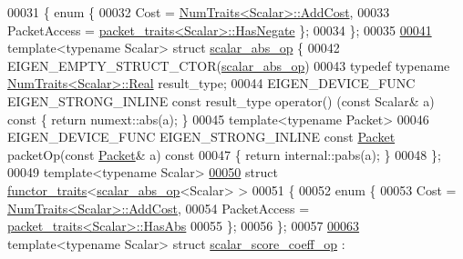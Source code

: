 \begin{DoxyCode}
00031 \{ \textcolor{keyword}{enum} \{
00032     Cost = \hyperlink{group___core___module_struct_eigen_1_1_num_traits}{NumTraits<Scalar>::AddCost},
00033     PacketAccess = \hyperlink{struct_eigen_1_1internal_1_1packet__traits}{packet\_traits<Scalar>::HasNegate} \};
00034 \};
00035 
\hyperlink{struct_eigen_1_1internal_1_1scalar__abs__op}{00041} \textcolor{keyword}{template}<\textcolor{keyword}{typename} Scalar> \textcolor{keyword}{struct }\hyperlink{struct_eigen_1_1internal_1_1scalar__abs__op}{scalar\_abs\_op} \{
00042   EIGEN\_EMPTY\_STRUCT\_CTOR(\hyperlink{struct_eigen_1_1internal_1_1scalar__abs__op}{scalar\_abs\_op})
00043   \textcolor{keyword}{typedef} \textcolor{keyword}{typename} \hyperlink{group___core___module_struct_eigen_1_1_num_traits}{NumTraits<Scalar>::Real} result\_type;
00044   EIGEN\_DEVICE\_FUNC EIGEN\_STRONG\_INLINE \textcolor{keyword}{const} result\_type operator() (\textcolor{keyword}{const} Scalar& a)\textcolor{keyword}{ const }\{ \textcolor{keywordflow}{return} 
      numext::abs(a); \}
00045   \textcolor{keyword}{template}<\textcolor{keyword}{typename} Packet>
00046   EIGEN\_DEVICE\_FUNC EIGEN\_STRONG\_INLINE \textcolor{keyword}{const} \hyperlink{union_eigen_1_1internal_1_1_packet}{Packet} packetOp(\textcolor{keyword}{const} \hyperlink{union_eigen_1_1internal_1_1_packet}{Packet}& a)\textcolor{keyword}{ const}
00047 \textcolor{keyword}{  }\{ \textcolor{keywordflow}{return} internal::pabs(a); \}
00048 \};
00049 \textcolor{keyword}{template}<\textcolor{keyword}{typename} Scalar>
\hyperlink{struct_eigen_1_1internal_1_1functor__traits_3_01scalar__abs__op_3_01_scalar_01_4_01_4}{00050} \textcolor{keyword}{struct }\hyperlink{struct_eigen_1_1internal_1_1functor__traits}{functor\_traits}<\hyperlink{struct_eigen_1_1internal_1_1scalar__abs__op}{scalar\_abs\_op}<Scalar> >
00051 \{
00052   \textcolor{keyword}{enum} \{
00053     Cost = \hyperlink{group___core___module_struct_eigen_1_1_num_traits}{NumTraits<Scalar>::AddCost},
00054     PacketAccess = \hyperlink{struct_eigen_1_1internal_1_1packet__traits}{packet\_traits<Scalar>::HasAbs}
00055   \};
00056 \};
00057 
\hyperlink{struct_eigen_1_1internal_1_1scalar__score__coeff__op}{00063} \textcolor{keyword}{template}<\textcolor{keyword}{typename} Scalar> \textcolor{keyword}{struct }\hyperlink{struct_eigen_1_1internal_1_1scalar__score__coeff__op}{scalar\_score\_coeff\_op} : 

\end{DoxyCode}
